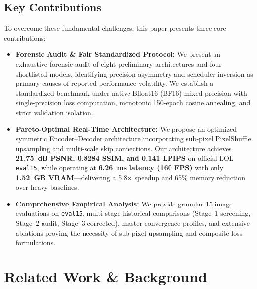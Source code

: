 \documentclass[journal,onecolumn,11pt]{IEEEtran}
\begin{document}
\subsection{Key Contributions}
To overcome these fundamental challenges, this paper presents three core contributions:
\begin{itemize}
    \item \textbf{Forensic Audit \& Fair Standardized Protocol:} We present an exhaustive forensic audit of eight preliminary architectures and four shortlisted models, identifying precision asymmetry and scheduler inversion as primary causes of reported performance volatility. We establish a standardized benchmark under native Bfloat16 (BF16) mixed precision with single-precision loss computation, monotonic 150-epoch cosine annealing, and strict validation isolation.
    \item \textbf{Pareto-Optimal Real-Time Architecture:} We propose an optimized symmetric Encoder--Decoder architecture incorporating sub-pixel PixelShuffle upsampling and multi-scale skip connections. Our architecture achieves \textbf{21.75~dB PSNR, 0.8284 SSIM, and 0.141 LPIPS} on official LOL \texttt{eval15}, while operating at \textbf{6.26~ms latency (160 FPS)} with only \textbf{1.52~GB VRAM}---delivering a 5.8$\times$ speedup and 65\% memory reduction over heavy baselines.
    \item \textbf{Comprehensive Empirical Analysis:} We provide granular 15-image evaluations on \texttt{eval15}, multi-stage historical comparisons (Stage~1 screening, Stage~2 audit, Stage~3 corrected), master convergence profiles, and extensive ablations proving the necessity of sub-pixel upsampling and composite loss formulations.
\end{itemize}

\section{Related Work \& Background}
\end{document}
